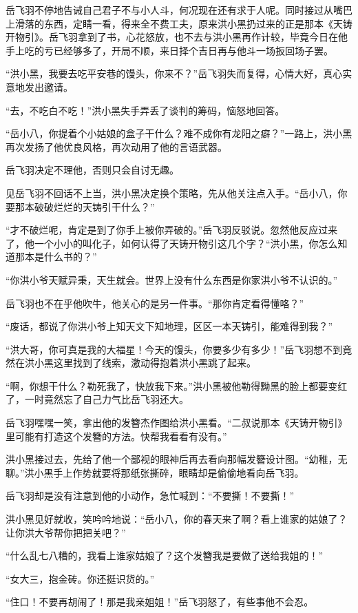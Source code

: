 岳飞羽不停地告诫自己君子不与小人斗，何况现在还有求于人呢。同时接过从嘴巴上滑落的东西，定睛一看，得来全不费工夫，原来洪小黑扔过来的正是那本《天铸开物引》。岳飞羽拿到了书，心花怒放，也不去与洪小黑再作计较，毕竟今日在他手上吃的亏已经够多了，开局不顺，来日择个吉日再与他斗一场扳回场子罢。

“洪小黑，我要去吃平安巷的馒头，你来不？”岳飞羽失而复得，心情大好，真心实意地发出邀请。

“去，不吃白不吃！”洪小黑失手弄丢了谈判的筹码，恼怒地回答。

“岳小八，你提着个小姑娘的盒子干什么？难不成你有龙阳之癖？”一路上，洪小黑再次发扬了他优良风格，再次动用了他的言语武器。

岳飞羽决定不理他，否则只会自讨无趣。

见岳飞羽不回话不上当，洪小黑决定换个策略，先从他关注点入手。“岳小八，你要那本破破烂烂的天铸引干什么？”

“才不破烂呢，肯定是到了你手上被你弄破的。”岳飞羽反驳说。忽然他反应过来了，他一个小小的叫化子，如何认得了天铸开物引这几个字？“洪小黑，你怎么知道那本是什么书的？”

“你洪小爷天赋异秉，天生就会。世界上没有什么东西是你家洪小爷不认识的。”

岳飞羽也不在乎他吹牛，他关心的是另一件事。“那你肯定看得懂咯？”

“废话，都说了你洪小爷上知天文下知地理，区区一本天铸引，能难得到我？”

“洪大哥，你可真是我的大福星！今天的馒头，你要多少有多少！”岳飞羽想不到竟然在洪小黑这里找到了线索，激动得抱着洪小黑跳了起来。

“啊，你想干什么？勒死我了，快放我下来。”洪小黑被他勒得黝黑的脸上都要变红了，一时竟然忘了自己力气比岳飞羽还大。

岳飞羽嘿嘿一笑，拿出他的发簪杰作图给洪小黑看。“二叔说那本《天铸开物引》里可能有打造这个发簪的方法。快帮我看看有没有。”

洪小黑接过去，先给了他一个鄙视的眼神后再去看向那幅发簪设计图。“幼稚，无聊。”洪小黑手上作势就要将那纸张撕碎，眼睛却是偷偷地看向岳飞羽。

岳飞羽却是没有注意到他的小动作，急忙喊到：“不要撕！不要撕！”

洪小黑见好就收，笑吟吟地说：“岳小八，你的春天来了啊？看上谁家的姑娘了？让你洪大爷帮你把把关吧？”

“什么乱七八糟的，我看上谁家姑娘了？这个发簪我是要做了送给我姐的！”

“女大三，抱金砖。你还挺识货的。”

“住口！不要再胡闹了！那是我亲姐姐！”岳飞羽怒了，有些事他不会忍。

